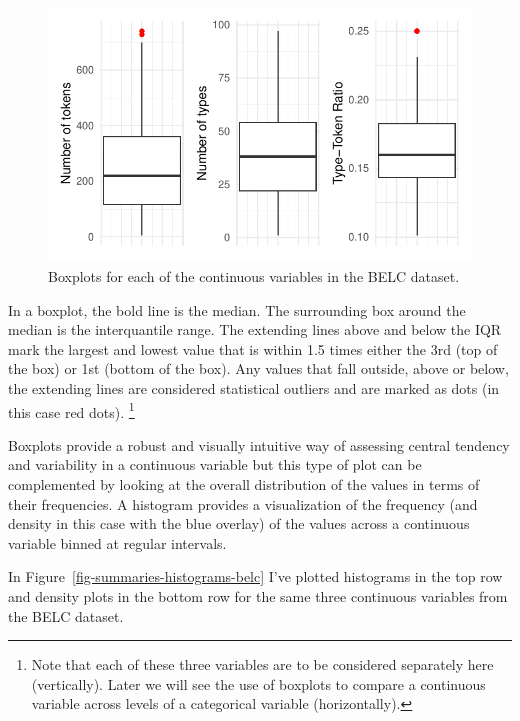 \documentclass[
  letterpaper,
]{scrbook}
\begin{document}
\begin{figure}[h]

{\centering \includegraphics{./approaching-analysis_files/figure-pdf/fig-summaries-boxplots-belc-1.pdf}

}

\caption{\label{fig-summaries-boxplots-belc}Boxplots for each of the
continuous variables in the BELC dataset.}

\end{figure}

In a boxplot, the bold line is the median. The surrounding box around
the median is the interquantile range. The extending lines above and
below the IQR mark the largest and lowest value that is within 1.5 times
either the 3rd (top of the box) or 1st (bottom of the box). Any values
that fall outside, above or below, the extending lines are considered
statistical outliers and are marked as dots (in this case red dots).
\footnote{Note that each of these three variables are to be considered
  separately here (vertically). Later we will see the use of boxplots to
  compare a continuous variable across levels of a categorical variable
  (horizontally).}

Boxplots provide a robust and visually intuitive way of assessing
central tendency and variability in a continuous variable but this type
of plot can be complemented by looking at the overall distribution of
the values in terms of their frequencies. A histogram provides a
visualization of the frequency (and density in this case with the blue
overlay) of the values across a continuous variable binned at regular
intervals.

In Figure~\ref{fig-summaries-histograms-belc} I've plotted histograms in
the top row and density plots in the bottom row for the same three
continuous variables from the BELC dataset.
\end{document}
